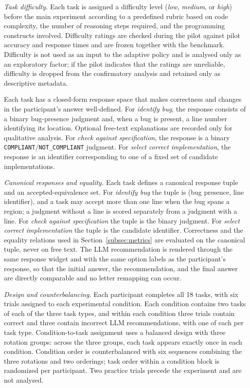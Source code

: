 \documentclass[oneside,final,14pt,a4paper]{extreport}
\begin{document}
\emph{Task difficulty.} Each task is assigned a difficulty level
(\emph{low}, \emph{medium}, or \emph{high}) before the main experiment
according to a predefined rubric based on code complexity, the number of
reasoning steps required, and the programming constructs involved. Difficulty
ratings are checked during the pilot against pilot accuracy and response
times and are frozen together with the benchmark. Difficulty is not used as
an input to the adaptive policy and is analysed only as an exploratory
factor; if the pilot indicates that the ratings are unreliable, difficulty is
dropped from the confirmatory analysis and retained only as descriptive
metadata.

Each task has a closed-form response space that makes correctness 
and changes in the participant's answer well-defined. For \emph{identify bug}, 
the response consists of a binary bug-presence judgment and, when a bug 
is present, a line number identifying its location. Optional free-text 
explanations are recorded only for qualitative analysis. 
For \emph{check against specification}, the response is a binary 
\texttt{COMPLIANT}/\texttt{NOT\_COMPLIANT} judgment. 
For \emph{select correct implementation}, the response is an identifier 
corresponding to one of a fixed set of candidate implementations.

\emph{Canonical responses and equality.} Each task defines a canonical response
tuple and an accepted-equivalence set. For \emph{identify bug} the tuple is
(bug presence, line identifier), and a task may accept more than one line when
the bug spans a region; a judgment without a line is scored separately from a
judgment with a line. For \emph{check against specification} the tuple is the
binary judgment. For \emph{select correct implementation} the tuple is the
candidate identifier. Correctness and the equality relations used in
Section~\ref{subsec:metrics} are evaluated on the canonical tuple, never on
free text. The LLM recommendation is rendered through the same response widget
and with the same option labels as the participant's response, so that the
initial answer, the recommendation, and the final answer are directly
comparable and no letter remapping can occur.

\emph{Design and counterbalancing.} Each participant completes all 18 tasks,
with six trials assigned to each experimental condition. Each condition
contains two tasks of each of the three task types, and within each condition
three trials contain correct and three contain incorrect LLM recommendations,
with one of each per task type. Condition-to-task assignment uses a balanced
design with three rotation groups: across the three groups, each task appears
exactly once in each condition. Condition order is counterbalanced with six
sequences combining the three rotations and two orderings; task order within a
condition block is randomized per participant. Two practice trials precede the
experiment and are not analysed.
\end{document}
